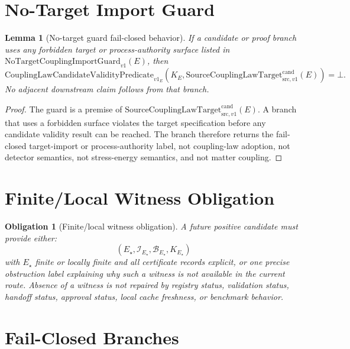 \documentclass[11pt]{article}
\newcommand{\SCLTarget}{\mathrm{SourceCouplingLawTarget}^{\mathrm{cand}}_{\mathrm{src},v1}}
\newcommand{\NTGuard}{\mathrm{NoTargetCouplingImportGuard}_{v1}}
\newcommand{\Validity}{\mathrm{CouplingLawCandidateValidityPredicate}_{v1}}
\newcommand{\Bottom}{\bot}
\newtheorem{lemma}{Lemma}
\newtheorem{obligation}{Obligation}
\begin{document}
\section{No-Target Import Guard}

\begin{lemma}[No-target guard fail-closed behavior]
If a candidate or proof branch uses any forbidden target or process-authority
surface listed in \(\NTGuard(E)\), then
\[
  \Validity_E(K_E,\SCLTarget(E))=\Bottom.
\]
No adjacent downstream claim follows from that branch.
\end{lemma}

\begin{proof}
The guard is a premise of \(\SCLTarget(E)\). A branch that uses a forbidden
surface violates the target specification before any candidate validity result
can be reached. The branch therefore returns the fail-closed target-import or
process-authority label, not coupling-law adoption, not detector semantics,
not stress-energy semantics, and not matter coupling.
\end{proof}

\section{Finite/Local Witness Obligation}

\begin{obligation}[Finite/local witness obligation]
A future positive candidate must provide either:
\[
  (E_\star,\mathcal I_{E_\star},\mathcal B_{E_\star},K_{E_\star})
\]
with \(E_\star\) finite or locally finite and all certificate records
explicit, or one precise obstruction label explaining why such a witness is
not available in the current route. Absence of a witness is not repaired by
registry status, validation status, handoff status, approval status, local
cache freshness, or benchmark behavior.
\end{obligation}

\section{Fail-Closed Branches}
\end{document}
